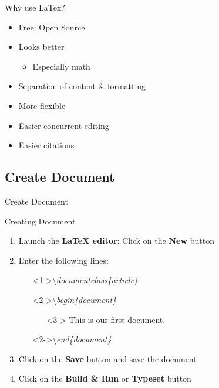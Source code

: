 \documentclass[11pt]{beamer}
\begin{document}
	\begin{frame}{Why use LaTex?}
		\begin{itemize}
			\item Free: Open Source
			\item Looks better
			\begin{itemize}
				\item Especially math
			\end{itemize}
			\item Separation of content \& formatting
			\item More flexible
			\item Easier concurrent editing
			\item Easier citations
		\end{itemize}
	\end{frame}
	\subsection{Create Document}
	\begin{frame}{}
		\begin{center}
			\huge Create Document
		\end{center}
	\end{frame}
	\begin{frame}{Creating Document}
		\begin{enumerate}
			\item Launch the \textbf{LaTeX editor}: Click on the \textbf{New} button
			\item Enter the following lines:
			\begin{itemize}
				\item[]<1->\textbackslash\textit{documentclass\{article\}}
				\item[]<2->\textbackslash\textit{begin\{document\}}
				\begin{itemize}
					\item[]<3-> This is our first document.
				\end{itemize}
				\item[]<2->\textbackslash\textit{end\{document\}}
			\end{itemize}
			\item<4-> Click on the \textbf{Save} button and save the document
			\item<5-> Click on the \textbf{Build \& Run} or \textbf{Typeset} button
		\end{enumerate}		
	\end{frame}
\end{document}
